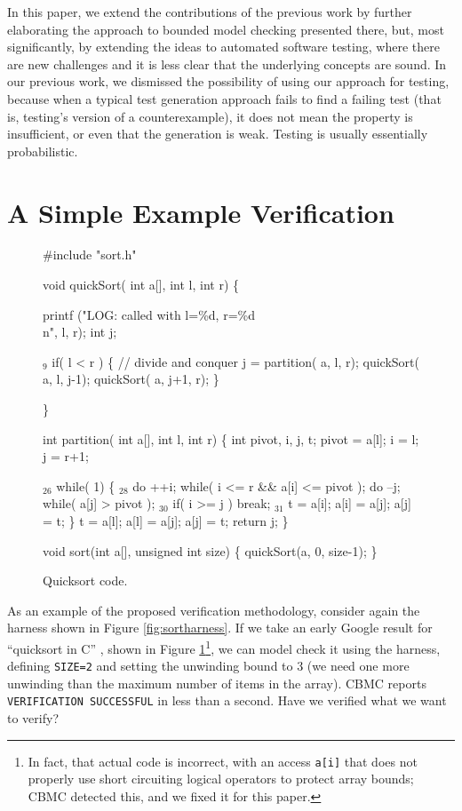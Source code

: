 \documentclass{svjour3}
\begin{document}
In this paper, we extend the contributions of the previous work by
further elaborating the approach to bounded model checking presented
there, but, most significantly, by extending the ideas to automated
software testing, where there are new challenges and it is less clear
that the underlying concepts are sound.  In our previous work, we
dismissed the possibility of using our approach for testing, because
when a typical test generation approach fails to find a failing test
(that is, testing's version of a counterexample), it does not mean the
property is insufficient, or even that the generation is weak.
Testing is usually essentially probabilistic.  

\section{A Simple Example Verification}

\begin{figure}
{\scriptsize
\begin{code}
 \#include "sort.h"

 void quickSort( int a[], int l, int r)
 \{

   printf ("LOG: called with l=\%d, r=\%d\\n", l, r); 
   int j;

{$_9$}  if( l < r ) 
     \{
       // divide and conquer
       j = partition( a, l, r);
       quickSort( a, l, j-1);
       quickSort( a, j+1, r);
     \}
  
 \}

 int partition( int a[], int l, int r) \{
   int pivot, i, j, t;
   pivot = a[l];
   i = l; j = r+1;
  
{$_{26}$} while( 1)
     \{
{$_{28}$}     do ++i; while( i <= r \&\& a[i] <= pivot );
       do --j; while( a[j] > pivot );
{$_{30}$}     if( i >= j ) break;
{$_{31}$}     t = a[i]; a[i] = a[j]; a[j] = t;
     \}
   t = a[l]; a[l] = a[j]; a[j] = t;
   return j;
 \}


 void sort(int a[], unsigned int size) \{
   quickSort(a, 0, size-1);
 \}
\end{code}
}
\caption{Quicksort code.}
\label{fig:qsort}
\end{figure}

As an example of the proposed verification methodology, consider again
the harness shown in Figure \ref{fig:sortharness}.  If we take an
early Google result for ``quicksort in C'' \cite{quicksortcode},
shown in Figure \ref{fig:qsort}\footnote{In fact, that actual code is
  incorrect, with an access {\tt a[i]} that does not properly use
  short circuiting logical operators to protect array bounds; CBMC
  detected this, and we fixed it for this paper.}, we can model check
it using the harness, defining {\tt SIZE=2} and setting the unwinding
bound to 3 (we need one more unwinding than the maximum
number of items in the array).  CBMC reports {\tt VERIFICATION
  SUCCESSFUL} in less than a second.  Have we verified
what we want to verify?
\end{document}
